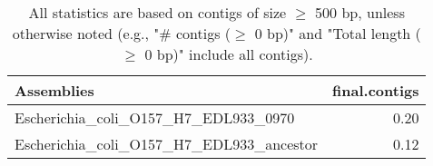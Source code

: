 \documentclass[12pt,a4paper]{article}
\begin{document}
\begin{table}[ht]
\begin{center}
\caption{All statistics are based on contigs of size $\geq$ 500 bp, unless otherwise noted (e.g., "\# contigs ($\geq$ 0 bp)" and "Total length ($\geq$ 0 bp)" include all contigs).}
\begin{tabular}{|l*{1}{|r}|}
\hline
Assemblies & final.contigs \\ \hline
Escherichia\_coli\_O157\_H7\_EDL933\_0970 & 0.20 \\ \hline
Escherichia\_coli\_O157\_H7\_EDL933\_ancestor & 0.12 \\ \hline
\end{tabular}
\end{center}
\end{table}
\end{document}
